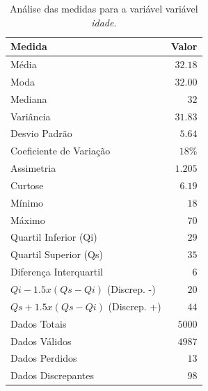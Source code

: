 \documentclass[10pt,a4paper,oneside]{article}
\begin{document}
\begin{table}[!h]
	\centering
	\caption{Análise das medidas para a variável variável \textit{idade}.}
	\vspace{0.5em}
	\label{table:medidas-idade}
	\begin{tabular}{l r}
		\toprule
		\textbf{Medida}               & \textbf{Valor} \\
		\midrule
		Média                         &  $32.18$       \\
		Moda                          &  $32.00$       \\
		Mediana                       &  $32$          \\
		Variância                     &  $31.83$       \\
		Desvio Padrão                 &  $5.64$        \\
		Coeficiente de Variação       &  $18 \%$       \\
		Assimetria                    &  $1.205$       \\
		Curtose                       &  $6.19$        \\
		Mínimo                        &  $18$          \\
		Máximo                        &  $70$          \\
		Quartil Inferior (Qi)         &  $29$          \\
		Quartil Superior (Qs)         &  $35$          \\
		Diferença Interquartil        &  $6$           \\
		$Qi-1.5x(Qs-Qi)$ (Discrep. -) &  $20$          \\
		$Qs+1.5x(Qs-Qi)$ (Discrep. +) &  $44$          \\
		Dados Totais                  &  $5000$        \\
		Dados Válidos                 &  $4987$        \\
		Dados Perdidos                &  $13$          \\
		Dados Discrepantes            &  $98$          \\ %
		\bottomrule
	\end{tabular}
\end{table}
\end{document}
